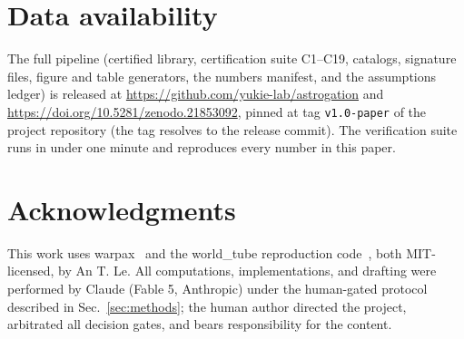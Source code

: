 \documentclass[11pt]{article}
\begin{document}
\section{Data availability}\label{sec:data}

The full pipeline (certified library, certification suite C1--C19,
catalogs, signature files, figure and table generators, the numbers
manifest, and the assumptions ledger) is released at
\url{https://github.com/yukie-lab/astrogation} and
\url{https://doi.org/10.5281/zenodo.21853092}, pinned at tag
\texttt{v1.0-paper} of the project repository (the
tag resolves to the release commit). The verification suite runs in under
one minute and reproduces every number in this paper.

\section*{Acknowledgments}

This work uses warpax~\cite{warpax-code} and the world\_tube reproduction
code~\cite{worldtube}, both MIT-licensed, by An T. Le. All computations,
implementations, and drafting were performed by Claude (Fable 5,
Anthropic) under the human-gated protocol described in
Sec.~\ref{sec:methods}; the human author directed the project, arbitrated
all decision gates, and bears responsibility for the content.
\end{document}
